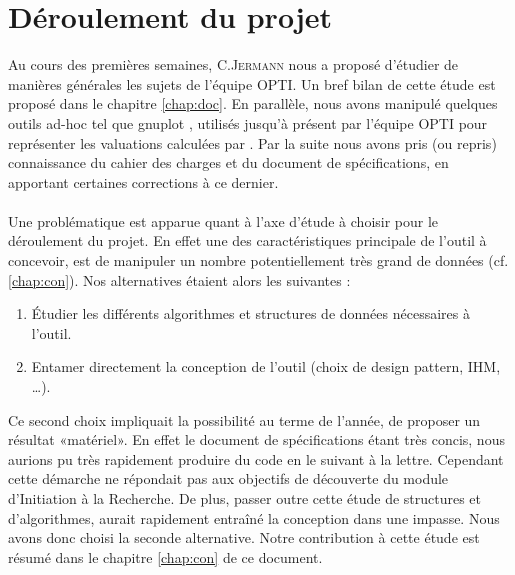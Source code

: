 \section{Déroulement du projet}
Au cours des premières semaines, C.\textsc{Jermann} nous a proposé d'étudier de manières générales les sujets de l'équipe \textsc{OPTI}. Un bref bilan de cette étude est proposé dans le chapitre \ref{chap:doc}. En parallèle, nous avons manipulé quelques outils ad-hoc tel que gnuplot \cite{gnu}, utilisés jusqu'à présent par l'équipe \textsc{OPTI} pour représenter les valuations calculées par \realpaver. Par la suite nous avons pris (ou repris) connaissance du cahier des charges et du document de spécifications, en apportant certaines corrections à ce dernier. 

\paragraph{}Une problématique est apparue quant à l'axe d'étude à choisir pour le déroulement du projet. En effet une des caractéristiques principale de l'outil à concevoir, est de manipuler un nombre potentiellement très grand de données (cf. \ref{chap:con}). Nos alternatives étaient alors les suivantes : 
\begin{enumerate}
\item
Étudier les différents algorithmes et structures de données nécessaires à l'outil.
\item
Entamer directement la conception de l'outil (choix de design pattern, IHM, \dots).
\end{enumerate} 
Ce second choix impliquait la possibilité au terme de l'année, de proposer un résultat «matériel». En effet le document de spécifications étant très concis, nous aurions pu très rapidement produire du code en le suivant à la lettre. Cependant cette démarche ne répondait pas aux objectifs de découverte du module d'Initiation à la Recherche. De plus, passer outre cette étude de structures et d'algorithmes, aurait rapidement entraîné la conception dans une impasse. Nous avons donc choisi la seconde alternative. Notre contribution à cette étude est résumé dans le chapitre \ref{chap:con} de ce document.

